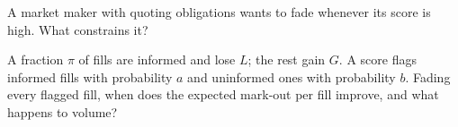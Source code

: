\begin{interviewq}\label{iq:hf:adverse-selection-and-toxicity:5}
A market maker with quoting obligations wants to fade whenever its score is high. What constrains it?
\end{interviewq}

\begin{interviewq}\label{iq:hf:adverse-selection-and-toxicity:6}
A fraction $\pi$ of fills are informed and lose $L$; the rest gain $G$. A score flags informed fills with probability $a$ and uninformed ones with
probability $b$. Fading every flagged fill, when does the expected mark-out per fill improve, and what happens to volume?
\end{interviewq}
